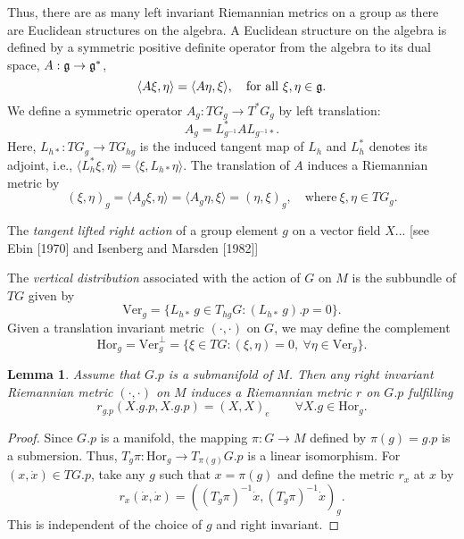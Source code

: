 \documentclass{article}
\theoremstyle{plain}
\newtheorem{lem}[teo]{Lemma}
\theoremstyle{definition}
\newcommand{\mf}{\ensuremath{\mathfrak}}
\begin{document}
Thus, there are as many left invariant Riemannian metrics on a group as there are Euclidean structures on the algebra. A Euclidean structure on the algebra is defined by a symmetric positive definite operator from the algebra to its dual space, $A:\mf g\to\mf g^*$,
\[
\langle A \xi,\eta\rangle = \langle A\eta,\xi\rangle,\quad \mathrm{for}\ \mathrm{all}\ \xi,\eta\in \mf g.
\]
We define a symmetric operator $A_g:TG_g\to T^*G_g$ by left translation:
\[
 A_g = L^*_{g^{-1}}AL_{g^{-1}*}.
\]
Here, $L_{h*}:TG_g\to TG_{hg}$ is the induced tangent map of $L_h$ and $L^*_h$ denotes its adjoint, i.e., $\langle L_h^*\xi,\eta\rangle=\langle \xi,L_{h*}\eta\rangle$. The translation of $A$ induces a Riemannian metric by
\[
  (\xi,\eta)_g=\langle A_g \xi,\eta\rangle=\langle A_g \eta,\xi\rangle=(\eta,\xi)_g,\quad \mathrm{where}\ \xi,\eta\in TG_g.
\]

The \textit{tangent lifted right action} of a group element $g$ on a vector field $X$... [see Ebin [1970] and Isenberg and Marsden [1982]]

The \textit{vertical distribution} associated with the action of $G$ on $M$ is the subbundle of $TG$ given by
\[
\mathrm{Ver}_g=\{L_{h*}\,g\in T_{hg}G : (L_{h*}\,g).p=0\}.
\]
Given a translation invariant metric $(\cdot,\cdot)$ on $G$, we may define the complement
\[
\mathrm{Hor}_g=\mathrm{Ver}_g^\perp=\{\xi\in TG : (\xi,\eta)=0,\ \forall\eta\in\mathrm{Ver}_g\}.
\]

\begin{lem}
Assume that $G.p$ is a submanifold of $M$. Then any right invariant Riemannian metric $(\cdot,\cdot)$ on $M$ induces a Riemannian metric $r$ on $G.p$ fulfilling
\[
r_{g.p}(X.g.p,X.g.p)=(X,X)_e \qquad\forall X.g\in\mathrm{Hor}_g.
\]
\end{lem}
\begin{proof}
Since $G.p$ is a manifold, the mapping $\pi:G\to M$ defined by $\pi(g)=g.p$ is a submersion. Thus, $T_g\pi: \mathrm{Hor}_g\to T_{\pi(g)}G.p$ is a linear isomorphism. For $(x,\dot{x})\in TG.p$, take any $g$ such that $x=\pi(g)$ and define the metric $r_x$ at $x$ by
\[
r_x(\dot{x},\dot{x})=\left((T_g\pi)^{-1}\dot{x},(T_g\pi)^{-1}\dot{x}\right)_g.
\]
This is independent of the choice of $g$ and right invariant.
\end{proof}
\end{document}
